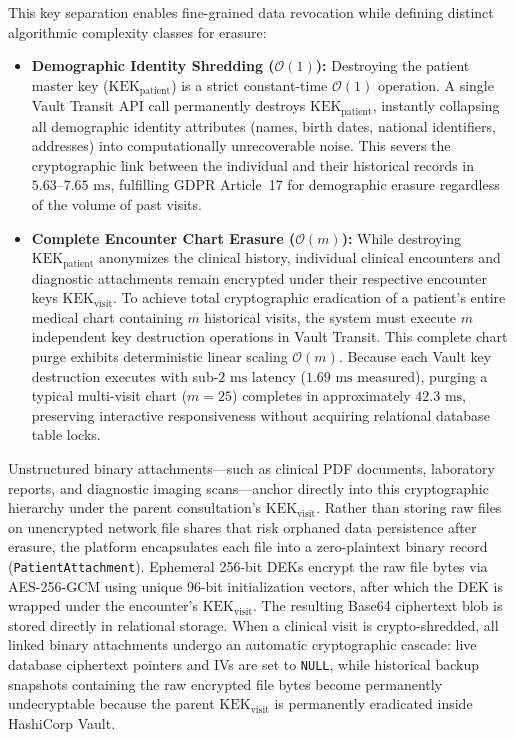 This key separation enables fine-grained data revocation while defining distinct algorithmic complexity classes for erasure:
\begin{itemize}
    \item \textbf{Demographic Identity Shredding ($\mathcal{O}(1)$):} Destroying the patient master key ($\text{KEK}_{\text{patient}}$) is a strict constant-time $\mathcal{O}(1)$ operation. A single Vault Transit API call permanently destroys $\text{KEK}_{\text{patient}}$, instantly collapsing all demographic identity attributes (names, birth dates, national identifiers, addresses) into computationally unrecoverable noise. This severs the cryptographic link between the individual and their historical records in $5.63\text{--}7.65\text{~ms}$, fulfilling GDPR Article~17 for demographic erasure regardless of the volume of past visits.
    \item \textbf{Complete Encounter Chart Erasure ($\mathcal{O}(m)$):} While destroying $\text{KEK}_{\text{patient}}$ anonymizes the clinical history, individual clinical encounters and diagnostic attachments remain encrypted under their respective encounter keys $\text{KEK}_{\text{visit}}$. To achieve total cryptographic eradication of a patient's entire medical chart containing $m$ historical visits, the system must execute $m$ independent key destruction operations in Vault Transit. This complete chart purge exhibits deterministic linear scaling $\mathcal{O}(m)$. Because each Vault key destruction executes with sub-$2\text{~ms}$ latency ($1.69\text{~ms}$ measured), purging a typical multi-visit chart ($m = 25$) completes in approximately $42.3\text{~ms}$, preserving interactive responsiveness without acquiring relational database table locks.
\end{itemize}

Unstructured binary attachments---such as clinical PDF documents, laboratory reports, and diagnostic imaging scans---anchor directly into this cryptographic hierarchy under the parent consultation's $\text{KEK}_{\text{visit}}$. Rather than storing raw files on unencrypted network file shares that risk orphaned data persistence after erasure, the platform encapsulates each file into a zero-plaintext binary record (\texttt{PatientAttachment}). Ephemeral 256-bit DEKs encrypt the raw file bytes via AES-256-GCM using unique 96-bit initialization vectors, after which the DEK is wrapped under the encounter's $\text{KEK}_{\text{visit}}$. The resulting Base64 ciphertext blob is stored directly in relational storage. When a clinical visit is crypto-shredded, all linked binary attachments undergo an automatic cryptographic cascade: live database ciphertext pointers and IVs are set to \texttt{NULL}, while historical backup snapshots containing the raw encrypted file bytes become permanently undecryptable because the parent $\text{KEK}_{\text{visit}}$ is permanently eradicated inside HashiCorp Vault.

